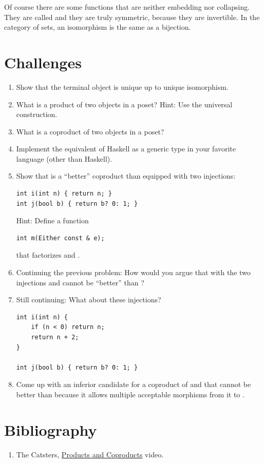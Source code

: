 Of course there are some functions that are neither embedding nor
collapsing. They are called  and they are truly
symmetric, because they are invertible. In the category of sets, an
isomorphism is the same as a bijection.

\section{Challenges}\label{challenges}

\begin{enumerate}
  \tightlist
\item
  Show that the terminal object is unique up to unique isomorphism.
\item
  What is a product of two objects in a poset? Hint: Use the universal
  construction.
\item
  What is a coproduct of two objects in a poset?
\item
  Implement the equivalent of Haskell  as a generic type
  in your favorite language (other than Haskell).
\item
  Show that  is a ``better'' coproduct than 
  equipped with two injections:

\begin{verbatim}
int i(int n) { return n; }
int j(bool b) { return b? 0: 1; }
\end{verbatim}

  Hint: Define a function

\begin{verbatim}
int m(Either const & e);
\end{verbatim}

  that factorizes  and .
\item
  Continuing the previous problem: How would you argue that 
  with the two injections  and  cannot be ``better''
  than ?
\item
  Still continuing: What about these injections?

\begin{verbatim}
int i(int n) { 
    if (n < 0) return n;
    return n + 2;
}

int j(bool b) { return b? 0: 1; }
\end{verbatim}
\item
  Come up with an inferior candidate for a coproduct of  and
   that cannot be better than  because it
  allows multiple acceptable morphisms from it to .
\end{enumerate}

\section{Bibliography}\label{bibliography}

\begin{enumerate}
\tightlist
\item
  The Catsters,
  \href{https://www.youtube.com/watch?v=upCSDIO9pjc}{Products and
  Coproducts} video.
\end{enumerate}